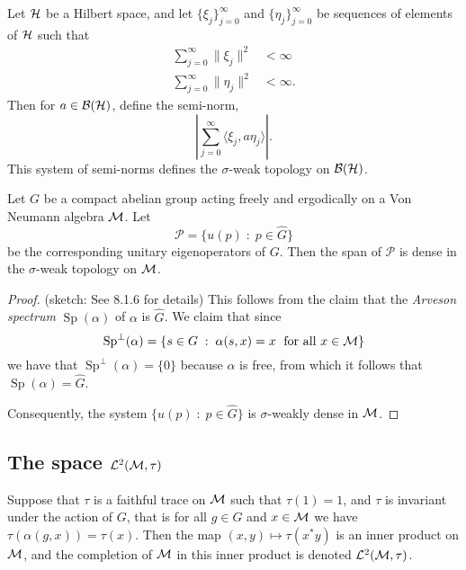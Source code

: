 \begin{definition}
    Let $\mathcal{H}$ be a Hilbert space, and let $\{\xi_j\}_{j = 0}^\infty$
    and $\{\eta_j\}_{j=0}^\infty$ be sequences of elements of $\mathcal{H}$
    such that 
    \begin{align}
        \sum_{j=0}^\infty \|\xi_j\|^2 &< \infty\\
        \sum_{j=0}^\infty \|\eta_j\|^2 &< \infty.
    \end{align}
    Then for $a \in \mathcal{B}(\mathcal{H})$, define the semi-norm,
    \begin{equation}
        \left| \sum_{j=0}^\infty \langle \xi_j,a\eta_j\rangle\right|.
    \end{equation}
    This system of semi-norms defines the $\sigma$-weak topology
    on $\mathcal{B}(\mathcal{H})$.
\end{definition}



\begin{proposition}
\label{densePolynomials}
    Let $G$ be a compact abelian group acting freely and ergodically 
    on a Von Neumann algebra $\mathcal{M}$. Let
    \begin{equation}
        \mathcal{P} = \{ u(p)\;:\; p \in \widehat{G}\}
    \end{equation}
    be the corresponding unitary eigenoperators of $G$. Then the span
    of $\mathcal{P}$ is dense in the $\sigma$-weak topology on $\mathcal{M}$.
\end{proposition}
\begin{proof}
    (sketch: See \cite{Pedersen1979} 8.1.6 for details) This follows from the claim that the \emph{Arveson spectrum}
    $\operatorname{Sp}(\alpha)$
    of $\alpha$ is $\widehat{G}$. We claim that since
    \begin{equation}
        \operatorname{Sp}^{\perp}(\alpha) = \{ s \in G\;:\; \alpha(s,x) = x\;\text{ for all }x \in \mathcal{M}\}
    \end{equation} 
    we have that $\operatorname{Sp}^\perp(\alpha) = \{0\}$ because $\alpha$
    is free,
    from which it follows that $\operatorname{Sp}(\alpha) = \widehat{G}$.
    
    Consequently, the system $\{u(p)\;:\; p \in \widehat{G}\}$ is $\sigma$-weakly
    dense in $\mathcal{M}$.
\end{proof}

\subsection{The space $\mathcal{L}^2(\mathcal{M},\tau)$}
Suppose that $\tau$ is a faithful trace on $\mathcal{M}$ such that $\tau(1) = 1$,
and $\tau$ is invariant under the action of $G$, that is for
all $g \in G$ and $x \in \mathcal{M}$ we have $\tau(\alpha(g,x)) = \tau(x)$. 
Then the map $(x,y)\mapsto \tau(x^*y)$ is an inner product on $\mathcal{M}$,
and the completion of $\mathcal{M}$ in this inner product is denoted $\mathcal{L}^2(\mathcal{M},\tau)$.

